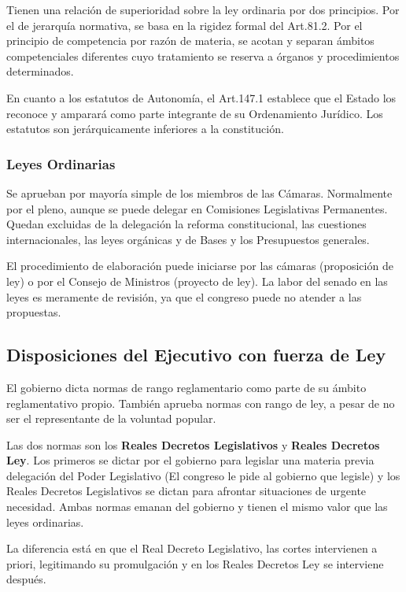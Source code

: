         Tienen una relación de superioridad sobre la ley ordinaria por dos principios. Por el de jerarquía normativa, se basa en la rigidez formal del Art.81.2. Por el principio de competencia por razón de materia, se acotan y separan ámbitos competenciales diferentes cuyo tratamiento se reserva a órganos y procedimientos determinados.

        En cuanto a los estatutos de Autonomía, el Art.147.1 establece que el Estado los reconoce y amparará como parte integrante de su Ordenamiento Jurídico. Los estatutos son jerárquicamente inferiores a la constitución. 

    \subsubsection{Leyes Ordinarias}
        Se aprueban por mayoría simple de los miembros de las Cámaras. Normalmente por el pleno, aunque se puede delegar en Comisiones Legislativas Permanentes. Quedan excluidas de la delegación la reforma constitucional, las cuestiones internacionales, las leyes orgánicas y de Bases y los Presupuestos generales.

        El procedimiento de elaboración puede iniciarse por las cámaras (proposición de ley) o por el Consejo de Ministros (proyecto de ley). La labor del senado en las leyes es meramente de revisión, ya que el congreso puede no atender a las propuestas.

\subsection{Disposiciones del Ejecutivo con fuerza de Ley} %
    El gobierno dicta normas de rango reglamentario como parte de su ámbito reglamentativo propio. También aprueba normas con rango de ley, a pesar de no ser el representante de la voluntad popular.

    Las dos normas son los \textbf{Reales Decretos Legislativos} y \textbf{Reales Decretos Ley}. Los primeros se dictar por el gobierno para legislar una materia previa delegación del Poder Legislativo (El congreso le pide al gobierno que legisle) y los Reales Decretos Legislativos se dictan para afrontar situaciones de urgente necesidad. Ambas normas emanan del gobierno y tienen el mismo valor que las leyes ordinarias.

    La diferencia está en que el Real Decreto Legislativo, las cortes intervienen a priori, legitimando su promulgación y en los Reales Decretos Ley se interviene después.

